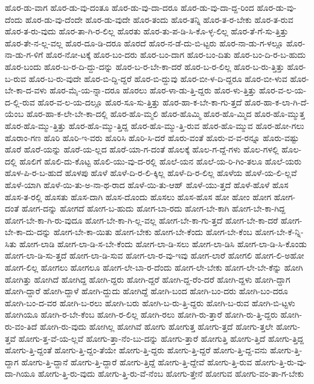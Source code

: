 {ಹೊರ-ಡು-ವಾಗ
ಹೊರ-ಡು-ವು-ದಂತೂ
ಹೊರ-ಡು-ವು-ದಾ-ದರೂ
ಹೊರ-ಡು-ವು-ದಾ-ದ್ದ-ರಿಂದ
ಹೊರ-ಡು-ವು-ದೆಂದು
ಹೊರ-ಡು-ವು-ದೆಂದೇ
ಹೊರ-ಡು-ವುದೇ
ಹೊರ-ತಂದು
ಹೊರ-ತನ್ನಿ
ಹೊರ-ತ-ರ-ಬೇಕು
ಹೊರ-ತ-ರುವ
ಹೊರ-ತ-ರು-ವುದು
ಹೊರ-ತಾ-ಗಿ-ರ-ಲಿಲ್ಲ
ಹೊರತು
ಹೊರ-ತು-ಪ-ಡಿ-ಸಿ-ಕೊ-ಳ್ಳ-ಲಿಲ್ಲ
ಹೊರ-ತೆ-ಗೆ-ಸು-ತ್ತಿತ್ತು
ಹೊರ-ತೇ-ನ-ಲ್ಲ-ವಲ್ಲ
ಹೊರ-ದೂ-ಡಿ-ದರೂ
ಹೊರದೆ
ಹೊರ-ನ-ಡೆ-ದು-ಬಿ-ಟ್ಟರು
ಹೊರ-ನಾ-ಡು-ಗ-ಳಲ್ಲೂ
ಹೊರ-ನಾ-ಡು-ಗ-ಳಿಗೆ
ಹೊರ-ನೋ-ಟಕ್ಕೆ
ಹೊರ-ಬಂ-ದರು
ಹೊರ-ಬಂ-ದಾಗ
ಹೊರ-ಬಂ-ದಿತು
ಹೊರ-ಬಂ-ದಿ-ರ-ಬ-ಹುದು
ಹೊರ-ಬಂದು
ಹೊರ-ಬ-ರ-ದಿ-ದ್ದು-ದನ್ನು
ಹೊರ-ಬ-ರ-ಬೇ-ಕಾ-ದರೆ
ಹೊರ-ಬ-ರ-ಲಿಲ್ಲ
ಹೊರ-ಬ-ರು-ತ್ತಿತ್ತು
ಹೊರ-ಬ-ರುವ
ಹೊರ-ಬ-ರು-ವುದೇ
ಹೊರ-ಬಿ-ದ್ದಿ-ದ್ದರೆ
ಹೊರ-ಬಿ-ದ್ದುವು
ಹೊರ-ಬೀ-ಳ-ದಿ-ದ್ದರೂ
ಹೊರ-ಬೀ-ಳುವ
ಹೊರ-ಬೇ-ಕಾ-ದ-ವಳು
ಹೊರ-ಮೈ-ಯ-ನ್ನಾ-ದರೂ
ಹೊರಲು
ಹೊರ-ಳಾ-ಡು-ತ್ತಿ-ದ್ದರು
ಹೊರ-ಳು-ತ್ತಿತ್ತು
ಹೊರ-ವ-ಲ-ಯ-ದ-ಲ್ಲಿ-ರುವ
ಹೊರ-ವ-ಲ-ಯ-ದಲ್ಲೂ
ಹೊರ-ಸೂ-ಸು-ತ್ತಿತ್ತು
ಹೊರ-ಹಾ-ಕ-ಬೇ-ಕಾ-ಗು-ತ್ತದೆ
ಹೊರ-ಹಾ-ಕ-ಲಾ-ಗಿ-ದೆ-ಯೆಂಬ
ಹೊರ-ಹಾ-ಕ-ಲೇ-ಬೇ-ಕಾ-ದಲ್ಲಿ
ಹೊರ-ಹೊ-ಮ್ಮಲಿ
ಹೊರ-ಹೊಮ್ಮಿ
ಹೊರ-ಹೊ-ಮ್ಮಿದ
ಹೊರ-ಹೊ-ಮ್ಮುತ್ತ
ಹೊರ-ಹೊ-ಮ್ಮು-ತ್ತಿತ್ತು
ಹೊರ-ಹೊ-ಮ್ಮು-ತ್ತಿದ್ದ
ಹೊರ-ಹೊ-ಮ್ಮು-ತ್ತಿ-ರುವ
ಹೊರ-ಹೊ-ಮ್ಮುವ
ಹೊರ-ಹೋ-ಗಲು
ಹೊರಾಂ-ಗಣ
ಹೊರಿ
ಹೊರಿ-ಇ-ವರು
ಹೊರಿಸಿ
ಹೊರಿ-ಸಿ-ದರೆ
ಹೊರು-ವಂತೆ
ಹೊರು-ವ-ವ-ರನ್ನೂ
ಹೊರು-ವಷ್ಟು
ಹೊರೆ
ಹೊರೆ-ಯನ್ನು
ಹೊರೆ-ಯ-ಲ್ಲದ
ಹೊರೆ-ಯಾ-ಗ-ದಂತೆ
ಹೊಲಕ್ಕೆ
ಹೊಲ-ಗ-ದ್ದೆ-ಗಳು
ಹೊಲ-ಗಳಲ್ಲಿ
ಹೊಲ-ದಲ್ಲಿ
ಹೊಲಿಗೆ
ಹೊಲಿ-ದು-ಕೊಟ್ಟ
ಹೊಲಿ-ಯು-ವು-ದ-ರಲ್ಲಿ
ಹೊಲೆ-ಯನ
ಹೊಲೆ-ಯ-ರಿ-ಗಿಂ-ತಲೂ
ಹೊಲೆ-ಯರು
ಹೊಳ-ಪಿ-ರ-ಬ-ಹುದೆ
ಹೊಳಪು
ಹೊಳೆ
ಹೊಳೆ-ದಿ-ರ-ಲಿ-ಕ್ಕಿಲ್ಲ
ಹೊಳೆ-ದಿ-ರ-ಲಿಲ್ಲ
ಹೊಳೆಯ
ಹೊಳೆ-ಯ-ಲಿ-ಲ್ಲವೆ
ಹೊಳೆ-ಯಾಗಿ
ಹೊಳೆ-ಯಿ-ತು-ಅ-ನಾ-ಥ-ರಾದ
ಹೊಳೆ-ಯಿ-ತು-ಆಹ್
ಹೊಳೆ-ಯು-ತ್ತದೆ
ಹೊಳೆ-ಹೊಳೆ
ಹೊಸ
ಹೊಸ-ತ-ರಲ್ಲಿ
ಹೊಸತು
ಹೊಸ-ದಾಗಿ
ಹೊಸ-ದೊಂದು
ಹೊಸಲು
ಹೊಸ-ಹೊಸ
ಹೋ
ಹೋಂ
ಹೋಗ
ಹೋಗ-ದಂತೆ
ಹೋಗ-ದನ್ನು
ಹೋಗದೆ
ಹೋಗ-ಬ-ಹುದು
ಹೋಗ-ಬಾ-ರದು
ಹೋಗ-ಬೇ-ಕಾಗಿ
ಹೋಗ-ಬೇ-ಕಾ-ಗಿದ್ದ
ಹೋಗ-ಬೇ-ಕಾ-ಗಿ-ರು-ವುದೂ
ಹೋಗ-ಬೇ-ಕಾ-ಗಿ-ಲ್ಲ-ವಲ್ಲ
ಹೋಗ-ಬೇ-ಕಾ-ಗು-ತ್ತದೆ
ಹೋಗ-ಬೇ-ಕಾ-ದರೆ
ಹೋಗ-ಬೇ-ಕಾ-ದು-ದನ್ನು
ಹೋಗ-ಬೇ-ಕಾ-ಯಿತು
ಹೋಗ-ಬೇಕು
ಹೋಗ-ಬೇ-ಕೆಂದು
ಹೋಗ-ಬೇ-ಕೆಂಬ
ಹೋಗ-ಬೇ-ಕೆ-ನ್ನಿ-ಸಿತು
ಹೋಗ-ಲಾಡಿ
ಹೋಗ-ಲಾ-ಡಿ-ಸ-ಬೇ-ಕೆಂದು
ಹೋಗ-ಲಾ-ಡಿ-ಸಲು
ಹೋಗ-ಲಾ-ಡಿಸಿ
ಹೋಗ-ಲಾ-ಡಿ-ಸಿ-ಕೊಂಡು
ಹೋಗ-ಲಾ-ಡಿ-ಸು-ತ್ತದೆ
ಹೋಗ-ಲಾ-ಡಿ-ಸುವ
ಹೋಗ-ಲಾ-ರ-ವು-ಇವು
ಹೋಗ-ಲಾರೆ
ಹೋಗಲಿ
ಹೋಗ-ಲಿ-ಅಹೋ
ಹೋಗ-ಲಿಲ್ಲ
ಹೋಗಲು
ಹೋಗಲೂ
ಹೋಗ-ಲೇ-ಬಾ-ರ-ದೆಂದು
ಹೋಗ-ಲೇ-ಬೇಕು
ಹೋಗ-ಲೇ-ಬೇ-ಕೆನ್ನು
ಹೋಗಿ
ಹೋಗಿತ್ತು
ಹೋಗಿದೆ
ಹೋಗಿದ್ದ
ಹೋಗಿ-ದ್ದರು
ಹೋಗಿ-ದ್ದರೆ
ಹೋಗಿ-ದ್ದ-ರೆಂ-ದರೆ
ಹೋಗಿ-ದ್ದಳು
ಹೋಗಿ-ದ್ದಾಗ
ಹೋಗಿ-ದ್ದಾರೆ
ಹೋಗಿ-ದ್ದಾಳೆ
ಹೋಗಿ-ದ್ದುದು
ಹೋಗಿದ್ದೆ
ಹೋಗಿ-ಬಂದ
ಹೋಗಿ-ಬಂ-ದರು
ಹೋಗಿ-ಬಂ-ದರೂ
ಹೋಗಿ-ಬಂ-ದ-ವರ
ಹೋಗಿ-ಬ-ರಲು
ಹೋಗಿ-ಬರು
ಹೋಗಿ-ಬ-ರು-ತ್ತಿ-ದ್ದರು
ಹೋಗಿ-ಬ-ರುವ
ಹೋಗಿ-ಬಿ-ಟ್ಟಳು
ಹೋಗಿಯೂ
ಹೋಗಿ-ರ-ಬೇ-ಕೆಂಬ
ಹೋಗಿ-ರ-ಲಿಲ್ಲ
ಹೋಗಿ-ರಲು
ಹೋಗಿ-ರು-ತ್ತಾರೆ
ಹೋಗಿ-ರು-ತ್ತಿ-ದ್ದರು
ಹೋಗಿ-ರು-ವಂ-ತಿದೆ
ಹೋಗಿ-ರು-ವುದು
ಹೋಗಿಲ್ಲ
ಹೋಗಿವೆ
ಹೋಗು
ಹೋಗುತ್ತ
ಹೋಗು-ತ್ತದೆ
ಹೋಗು-ತ್ತಲೇ
ಹೋಗು-ತ್ತವೆ
ಹೋಗು-ತ್ತ-ವೆ-ಯ-ಲ್ಲವೆ
ಹೋಗು-ತ್ತಾ-ನೆಂ-ಬು-ದನ್ನು
ಹೋಗು-ತ್ತಾರೆ
ಹೋಗುತ್ತಿ
ಹೋಗು-ತ್ತಿದೆ
ಹೋಗು-ತ್ತಿದ್ದ
ಹೋಗು-ತ್ತಿ-ದ್ದಂತೆ
ಹೋಗು-ತ್ತಿ-ದ್ದಂ-ತೆಯೇ
ಹೋಗು-ತ್ತಿ-ದ್ದರು
ಹೋಗು-ತ್ತಿ-ದ್ದರೆ
ಹೋಗು-ತ್ತಿ-ದ್ದ-ವನು
ಹೋಗು-ತ್ತಿ-ದ್ದಾಗ
ಹೋಗು-ತ್ತಿ-ದ್ದಾನೆ
ಹೋಗು-ತ್ತಿ-ದ್ದಾರೆ
ಹೋಗು-ತ್ತಿದ್ದೆ
ಹೋಗು-ತ್ತಿ-ದ್ದೇವೆ
ಹೋಗು-ತ್ತಿ-ರುವ
ಹೋಗು-ತ್ತಿ-ರು-ವು-ದಾ-ಗಿಯೂ
ಹೋಗು-ತ್ತಿ-ರು-ವುದು
ಹೋಗು-ತ್ತಿ-ರು-ವೆ-ನೆಂಬ
ಹೋಗು-ತ್ತೇನೆ
ಹೋಗುವ
ಹೋಗು-ವಂ-ತಾ-ಗ-ಬೇಕು
}
